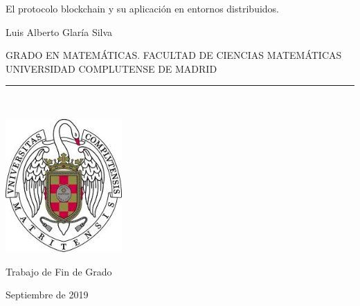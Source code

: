 \begin{center}

   \vspace{1cm}


   {\Large El protocolo blockchain y su aplicación en entornos distribuidos.}\\

   \vspace{0.5cm}



   \vspace{0.5cm}



   {\large Luis Alberto Glaría Silva}\\

   \vspace{0.5cm}




   GRADO EN MATEMÁTICAS. FACULTAD DE CIENCIAS MATEMÁTICAS\\
   UNIVERSIDAD COMPLUTENSE DE MADRID \\


   \vspace{0.65cm}
   \rule{2in}{0.5pt}\\
   \vspace{0.85cm}

  \includegraphics[height=2in]{figures/escudo.jpg}
  

   \vspace{0.5cm}
Trabajo de Fin de Grado

   \vspace{0.5cm}






  Septiembre de 2019\\
   \vspace{1cm}

\end{center}

